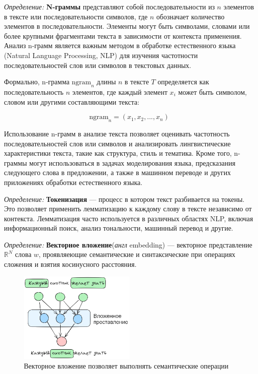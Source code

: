 \textit{Определение:} \textbf{N-граммы} представляют собой последовательности из \( n \) элементов в тексте или последовательности символов, 
где \( n \) обозначает количество элементов в последовательности. Элементы могут быть символами, словами или более крупными фрагментами текста 
в зависимости от контекста применения. Анализ n-грамм является важным методом в обработке естественного языка (Natural Language Processing, NLP) 
для изучения частотности последовательностей слов или символов в текстовых данных.

Формально, n-грамма \( \text{ngram}_n \) длины \( n \) в тексте \( T \) определяется как последовательность \( n \) элементов, 
где каждый элемент \( x_i \) может быть символом, словом или другими составляющими текста:

\[ \text{ngram}_n = (x_1, x_2, ..., x_n) \]

Использование n-грамм в анализе текста позволяет оценивать частотность последовательностей слов или символов и анализировать лингвистические характеристики
 текста, такие как структура, стиль и тематика. Кроме того, n-граммы могут использоваться в задачах моделирования языка, предсказания следующего слова в предложении, 
 а также в машинном переводе и других приложениях обработки естественного языка.

\textit{Определение:} \textbf{Токенизация} --- процесс в котором текст разбивается на токены. 
Это позволяет применить лемматизацию к каждому слову в тексте независимо от контекста.
Лемматизация часто используется в различных областях NLP, включая информационный поиск, анализ тональности, машинный перевод и другие.

\textit{Определение:} \textbf{Векторное вложение}(\textit{англ} embedding) --- векторное представление $\mathbb{R}^N$ слова $w$,
проявляеющие семантические и синтаксические при операциях сложения и взятия косинусного расстояния.

\begin{figure}[h]
    \centering
    \includegraphics[width=0.5\textwidth]{assets/ml/nlp/word2vec.excalidraw.png}
    \caption{Векторное вложение позволяет выполнять семантические операции}
    \label{word2vec}
\end{figure}

